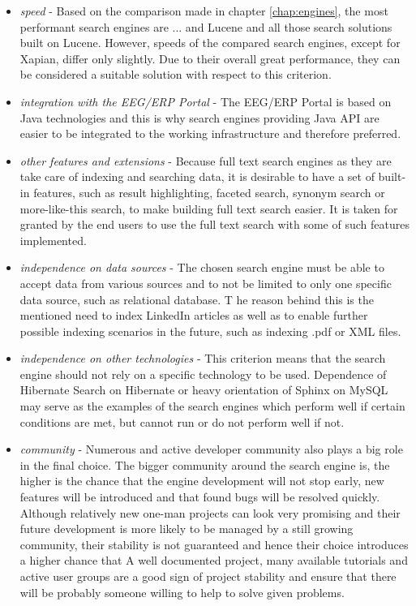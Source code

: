 \begin{itemize}
	\item \textit{speed} - Based on the comparison made in chapter \ref{chap:engines}, the most performant search engines are ... and Lucene and all those search solutions built on Lucene. 
	However, speeds of the compared search engines, except for Xapian, differ only slightly. Due to their overall great performance, they can be considered a suitable solution with respect to this criterion.
	\item \textit{integration with the EEG/ERP Portal} - The EEG/ERP Portal is based on Java technologies and this is why search engines providing Java API are easier to be integrated to the working infrastructure and therefore preferred.
	\item \textit{other features and extensions} - Because full text search
engines as they are take care of indexing and searching data, it is desirable to have a set of built-in features, such as result highlighting, faceted search, synonym search or more-like-this search, to make building full text search easier.
 It is taken for granted by the end users to use the full text search with some of such features implemented. 
	\item \textit{independence on data sources} - The chosen search engine must be able to accept data from various sources and to not be limited to only one specific data source, such as relational database. T
	he reason behind this is the mentioned need to index LinkedIn articles as well as to enable further possible indexing scenarios in the future, such as indexing .pdf or XML files.
	\item \textit{independence on other technologies} - This criterion means that the search engine should not rely on a specific technology to be used. 
	Dependence of Hibernate Search on Hibernate or heavy orientation of Sphinx on MySQL may serve as the examples of the search engines which perform well if certain conditions are met, but cannot run or do not perform well if not. 
	\item \textit{community} - Numerous and active developer community also plays a big role in the final choice. 
	The bigger community around the search engine is, the higher is the chance that the engine development will not stop early, new features will be introduced and that found bugs will be resolved quickly. 
	Although relatively new one-man projects can look very promising and their future development is more likely to be managed by a still growing community, their stability is not guaranteed and hence their choice introduces a higher chance that
	A well documented project, many available tutorials and active user groups are a good sign of project stability and ensure that there will be probably someone willing to help to solve given problems.

\end{itemize}

